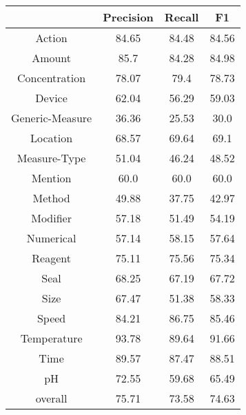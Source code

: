 \begin{table}[htbp]
\centering
\begin{tabular}{|c|c|c|c|}
\hline
 & Precision & Recall & F1\\
\hline
Action & 84.65 & 84.48 & 84.56\\
\hline
Amount & 85.7 & 84.28 & 84.98\\
\hline
Concentration & 78.07 & 79.4 & 78.73\\
\hline
Device & 62.04 & 56.29 & 59.03\\
\hline
Generic-Measure & 36.36 & 25.53 & 30.0\\
\hline
Location & 68.57 & 69.64 & 69.1\\
\hline
Measure-Type & 51.04 & 46.24 & 48.52\\
\hline
Mention & 60.0 & 60.0 & 60.0\\
\hline
Method & 49.88 & 37.75 & 42.97\\
\hline
Modifier & 57.18 & 51.49 & 54.19\\
\hline
Numerical & 57.14 & 58.15 & 57.64\\
\hline
Reagent & 75.11 & 75.56 & 75.34\\
\hline
Seal & 68.25 & 67.19 & 67.72\\
\hline
Size & 67.47 & 51.38 & 58.33\\
\hline
Speed & 84.21 & 86.75 & 85.46\\
\hline
Temperature & 93.78 & 89.64 & 91.66\\
\hline
Time & 89.57 & 87.47 & 88.51\\
\hline
pH & 72.55 & 59.68 & 65.49\\
\hline
overall & 75.71 & 73.58 & 74.63\\
\hline
\end{tabular}
\caption{}
\end{table}




